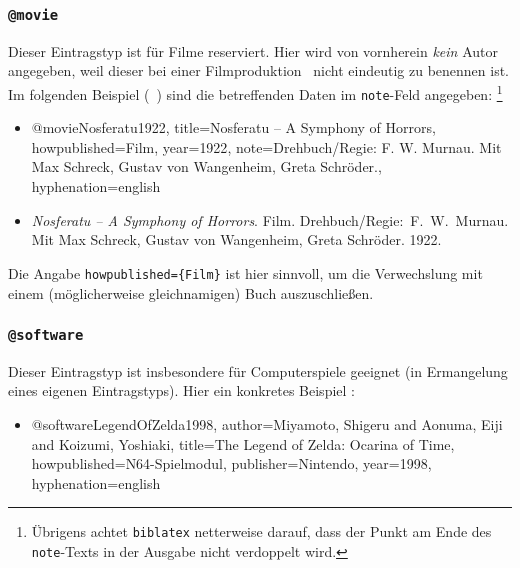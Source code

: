 \subsubsection{\texttt{@movie}}
\label{sec:@movie}
Dieser Eintragstyp ist für Filme reserviert. 
Hier wird von vornherein \emph{kein} Autor angegeben, weil dieser bei 
einer Filmproduktion \ia\ nicht eindeutig zu benennen ist. 
Im folgenden Beispiel (\sa\ \cite{Psycho1960}) sind die betreffenden Daten 
im \texttt{note}-Feld angegeben:%
\footnote{Übrigens achtet \texttt{biblatex} netterweise darauf, dass der  
Punkt am Ende des \texttt{note}-Texts in der Ausgabe nicht verdoppelt wird.}
%
\begin{itemize}
\item[] 
\begin{GenericCode}[numbers=none]
@movie{Nosferatu1922,
    title={Nosferatu -- A Symphony of Horrors},
    howpublished={Film},
    year={1922},
    note={Drehbuch/Regie: F. W. Murnau. Mit Max Schreck, Gustav von Wangenheim, Greta Schröder.},
    hyphenation={english}
}
\end{GenericCode}
\item[\cite{Nosferatu1922}]
\textit{Nosferatu -- A Symphony of Horrors}. Film. 
Drehbuch/Regie:\ F.\ W.\ Murnau. 
Mit Max Schreck, Gustav von Wangenheim, Greta Schröder.
1922.
\end{itemize}
%
Die Angabe \verb!howpublished={Film}! ist hier sinnvoll, um die Verwechslung
mit einem (möglicherweise gleichnamigen) Buch auszuschließen.



\subsubsection{\texttt{@software}}
\label{sec:@software}
Dieser Eintragstyp ist insbesondere für Computerspiele geeignet (in Ermangelung
eines eigenen Eintragstyps). Hier ein konkretes Beispiel \cite{LegendOfZelda1998}:
%
\begin{itemize}
\item[] 
\begin{GenericCode}[numbers=none]
@software{LegendOfZelda1998,
   author={Miyamoto, Shigeru and Aonuma, Eiji and Koizumi, Yoshiaki},
   title={The Legend of Zelda: Ocarina of Time},
   howpublished={N64-Spielmodul},
   publisher={Nintendo},
   year={1998},
   hyphenation={english}
}
\end{GenericCode}
\end{itemize}



